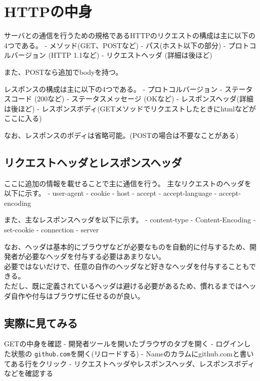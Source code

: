 \section{HTTPの中身}\label{httpux306eux4e2dux8eab}

サーバとの通信を行うための規格であるHTTPのリクエストの構成は主に以下の4つである。
- メソッド(GET、POSTなど) - パス(ホスト以下の部分) -
プロトコルバージョン (HTTP 1.1など) - リクエストヘッダ (詳細は後ほど)

また、POSTなら追加でbodyを持つ。

レスポンスの構成は主に以下の4つである。 - プロトコルバージョン -
ステータスコード (200など) - ステータスメッセージ (OKなど) -
レスポンスヘッダ(詳細は後ほど) -
レスポンスボディ(GETメソッドでリクエストしたときにhtmlなどがここに入る)

なお、レスポンスのボディは省略可能。(POSTの場合は不要なことがある)

\subsection{リクエストヘッダとレスポンスヘッダ}\label{ux30eaux30afux30a8ux30b9ux30c8ux30d8ux30c3ux30c0ux3068ux30ecux30b9ux30ddux30f3ux30b9ux30d8ux30c3ux30c0}

ここに追加の情報を載せることで主に通信を行う。
主なリクエストのヘッダを以下に示す。 - user-agent - cookie - host -
accept - accept-language - accept-encoding

また、主なレスポンスヘッダを以下に示す。 - content-type -
Content-Encoding - set-cookie - connection - server

なお、ヘッダは基本的にブラウザなどが必要なものを自動的に付与するため、開発者が必要なヘッダを付与する必要はあまりない。\\
必要ではないだけで、任意の自作のヘッダなど好きなヘッダを付与することもできる。\\
ただし、既に定義されているヘッダは避ける必要があるため、慣れるまではヘッダ自作や付与はブラウザに任せるのが良い。

\subsection{実際に見てみる}\label{ux5b9fux969bux306bux898bux3066ux307fux308b}

GETの中身を確認 - 開発者ツールを開いたブラウザのタブを開く -
ログインした状態の \texttt{github.com}を開く(リロードする) -
Nameのカラムにgithub.comと書いてある行をクリック -
リクエストヘッダやレスポンスヘッダ、レスポンスボディなどを確認する

